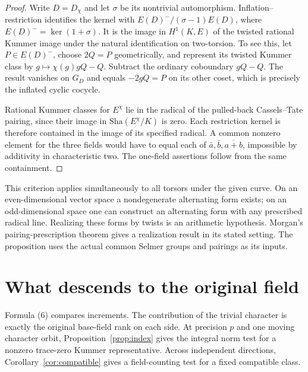\documentclass[11pt]{article}
\newcommand{\Sha}{\mathrm{Sha}}
\begin{document}
\begin{proof}
Write $D=D_\chi$ and let $\sigma$ be its nontrivial automorphism.
Inflation--restriction identifies the kernel with
$E(D)^-/(\sigma-1)E(D)$, where $E(D)^-=\ker(1+\sigma)$.
It is the image in $H^1(K,E)$ of the twisted rational Kummer image
under the natural identification on two-torsion. To see this, let
$P\in E(D)^-$, choose $2Q=P$ geometrically, and represent its twisted
Kummer class by $g\mapsto \chi(g)gQ-Q$. Subtract the ordinary coboundary
$gQ-Q$. The result vanishes on $G_D$ and equals $-2gQ=P$ on its
other coset, which is precisely the inflated cyclic cocycle.

Rational Kummer classes for $E^\chi$ lie in the radical of the
pulled-back Cassels--Tate pairing, since their image in $\Sha(E^\chi/K)$
is zero. Each restriction kernel is therefore contained in the image
of its specified radical. A common nonzero element for the three fields
would have to equal each of $\bar a,\bar b,\overline{a+b}$, impossible
by additivity in characteristic two. The one-field assertions follow
from the same containment.
\end{proof}

This criterion applies simultaneously to all torsors under the given
curve. On an even-dimensional vector space a nondegenerate alternating
form exists; on an odd-dimensional space one can construct an alternating
form with any prescribed radical line. Realizing these forms by twists
is an arithmetic hypothesis. Morgan's pairing-prescription theorem
\cite[Thm.~1.14]{Morgan} gives a realization result in its stated
setting. The proposition uses the actual common Selmer groups and
pairings as its inputs.

\section{What descends to the original field}
Formula (6) compares increments. The contribution of the trivial
character is exactly the original base-field rank on each side.
At precision $p$ and one moving character orbit, Proposition~\ref{prop:index}
gives the integral norm test for a nonzero trace-zero Kummer
representative. Across independent directions,
Corollary~\ref{cor:compatible} gives a field-counting test for a
fixed compatible class.
\end{document}

